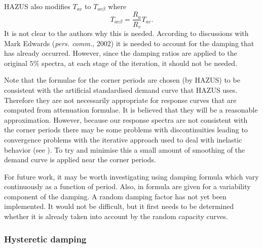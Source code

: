 HAZUS also modifies $T_{av}$ to $T_{av\beta}$ where
$$
 T_{av\beta} = \frac{R_a}{R_v}T_{av}.
$$
It is not clear to the authors why this is needed. According to
discussions with Mark Edwards (\textit{pers. comm.}, 2002) it is
needed to account for the damping that has already occurred.
However, since the damping ratios are applied to the original
$5\%$ spectra, at each stage of the iteration, it should not be
needed.

Note that the formulae for the corner periods are chosen (by
HAZUS) to be consistent with the artificial standardised demand
curve that HAZUS uses. Therefore they are not
necessarily appropriate for response curves that are computed from
attenuation formulae. It is believed that they will be a
reasonable approximation. However, because our response spectra
are not consistent with the corner periods there may be some
problems with discontinuities leading to convergence problems with
the iterative approach used to deal with inelastic behavior (see
). To try and minimise this a small
amount of smoothing of the demand curve is
applied near the corner periods.

For future work, it may be worth investigating using damping
formula which vary continuously as a function of period. Also, in
\cite{Newmark82} formula are given for a variability component of
the damping. A random damping factor has not yet been implemented.
It would not be difficult, but it first needs to be determined
whether it is already taken into account by the random capacity
curves.



\subsubsection{Hysteretic damping}
\label{sec:dam-hystericdamping}

